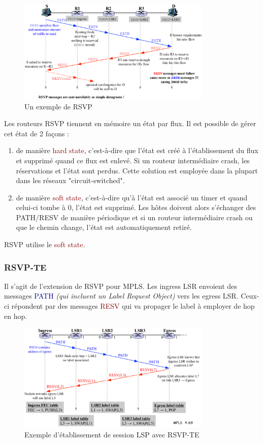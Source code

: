 \documentclass{article}
\newcommand{\blu}[1]{\textcolor{darkblue}{#1}}
\newcommand{\rouge}[1]{\textcolor{darkred}{#1}}
\begin{document}
\begin{sffamily}
\begin{figure}[h!]
    \begin{center}
    \includegraphics[width=350px]{img_023.pdf}
    \caption{Un exemple de RSVP}
    \end{center}	
\end{figure}

Les routeurs RSVP tiennent en mémoire un état par flux. Il est possible de gérer cet état de 2 façons :
\begin{enumerate}
\item de manière \rouge{hard state}, c'est-à-dire que l'état est créé à l'établissement du flux et supprimé quand ce flux est 
enlevé. Si un routeur intermédiaire crash, les réservations et l'état sont perdus. Cette solution est employée dans la plupart 
dans les réseaux "circuit-switched".
\item de manière \rouge{soft state}, c'est-à-dire qu'à l'état est associé un timer et quand celui-ci tombe à 0, l'état est 
supprimé. Les hôtes doivent alors s'échanger des PATH/RESV de manière périodique et si un routeur intermédiaire crash ou que le
chemin change, l'état est automatiquement retiré. \\
\end{enumerate}

RSVP utilise le \rouge{soft state}.

\subsubsection{RSVP-TE}

Il s'agit de l'extension de RSVP pour MPLS. Les ingress LSR envoient des messages \blu{PATH} \textit{(qui incluent un Label 
Request Object)} vers les egress LSR. Ceux-ci répondent par des messages \rouge{RESV} qui va propager le label à employer de 
hop en hop.

\begin{figure}[h!]
    \begin{center}
    \includegraphics[width=350px]{img_024.pdf}
    \caption{Exemple d'établissement de session LSP avec RSVP-TE}
    \end{center}	
\end{figure}


\end{sffamily}
\end{document}

